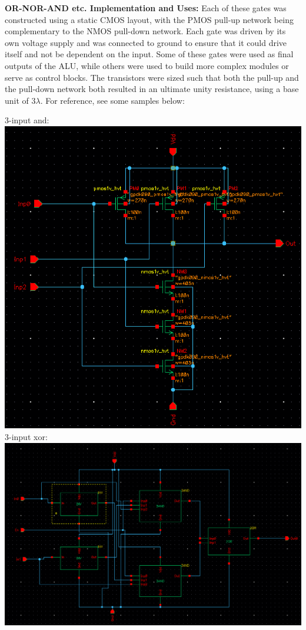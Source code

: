 \documentclass[12pt]{article}
\begin{document}
	\textbf{OR-NOR-AND etc. Implementation and Uses:}
	\newline \newline
	Each of these gates was constructed using a static CMOS layout, with the PMOS pull-up 
	network being complementary to the NMOS pull-down network. Each gate was driven by
	its own voltage supply and was connected to ground to ensure that it could drive itself and
	not be dependent on the input. Some of these gates were used as final outputs of the ALU,
	while others were used to build more complex modules or serve as control blocks. The 
	transistors were sized such that both the pull-up and the pull-down network
	both resulted in an ultimate unity resistance, using a base unit of 3$\lambda$. 
	For reference, see some samples below:
  
	\newline \newline

  3-input and:\\
  \includegraphics[scale=0.4]{3and.png}
  \\
  3-input xor:\\
  \includegraphics[scale=0.4]{xor.png}
  \\
	
\end{document}
